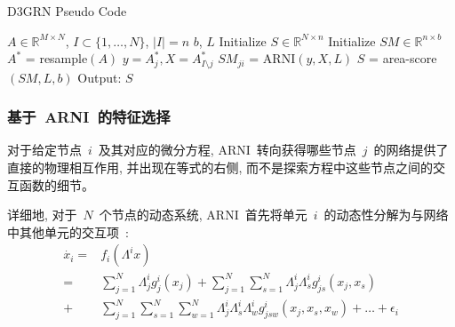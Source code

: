 \begin{algorithm}
  \caption{D3GRN Pseudo Code}
  \label{alg:D3GRN}
  \begin{algorithmic}[1]
  \Require $A \in \mathbb{R}^{M \times N}$, $I \subset \{1,\ldots,N\}$, 
            $|I| = n$                                   
  \Ensure $b$, $L$                                      
  \State Initialize $S \in \mathbb{R}^{N \times n}$     
  \State Initialize $SM \in \mathbb{R}^{n \times b}$     
                                     
        \State $A^{*}$ = resample$(A)$                  
                                              
        \State $y = A^{*}_j, X = A^{*}_{I\setminus j}$
        \State $SM_{ji}$ = ARNI$(y,X,L)$                    
        \EndFor
  \EndFor           
  \State $S$ = area-score$(SM,L,b)$                      
  \State Output: $S$                                    
\end{algorithmic}
\end{algorithm}


\subsubsection{基于~ARNI~的特征选择}

对于给定节点~$i$~及其对应的微分方程, 
ARNI~转向获得哪些节点~$j$~的网络提供了直接的物理相互作用, 并出现在等式的右侧, 
而不是探索方程中这些节点之间的交互函数的细节。

详细地, 对于~$N$~个节点的动态系统, 
ARNI~首先将单元~$i$~的动态性分解为与网络中其他单元的交互项~\cite{casadiego2017model}:
\begin{equation}
\label{eq:xi}
\begin{split}
\dot{x_i}= & f_i(\Lambda ^i x)\\
         = &\sum_{j=1}^{N} \Lambda^i_{j} g^i_j(x_j) + 
                             \sum_{j=1}^{N} \sum_{s=1}^{N}\Lambda^i_{j}\Lambda^i_{s}g^i_{js}(x_j,x_s)\\
         + &\sum_{j=1}^{N} \sum_{s=1}^{N} \sum_{w=1}^{N}\Lambda^i_{j}\Lambda^i_{s}\Lambda^i_{w}g^i_{jsw}(x_j,x_s,x_w)+ \ldots + \epsilon_{i}
\end{split}
\end{equation}

